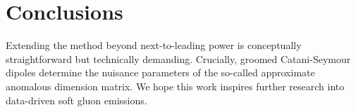 \section{Conclusions}\label{sec:conclusions}

Extending the method beyond next-to-leading power is conceptually
straightforward but technically demanding. Crucially, groomed
Catani-Seymour dipoles determine the nuisance parameters of the
so-called approximate anomalous dimension matrix. We hope this work
inspires further research into data-driven soft gluon emissions.

